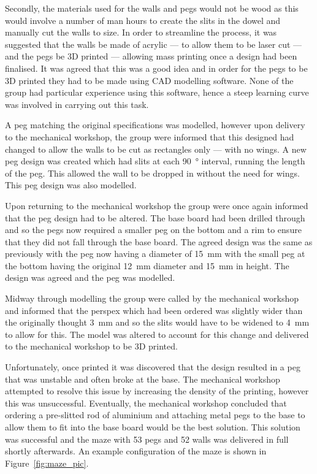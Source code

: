 Secondly, the materials used for the walls and pegs would not be wood as this 
would involve a number of man hours to create the slits in the dowel and 
manually cut the walls to size. In order to streamline the process, it was 
suggested that the walls be made of acrylic --- to allow 
them to be laser cut --- and the pegs be 3D printed --- allowing mass printing 
once a design had been finalised. It was agreed that this was a good idea and 
in order for the pegs to be 3D printed they had to be made using CAD modelling 
software. None of the group had particular experience using this software, hence 
a steep learning curve was involved in carrying out this task. 

A peg matching the original specifications was modelled, however upon delivery 
to the mechanical workshop, the group were informed that this designed had 
changed to allow the walls to be cut as rectangles only --- with no wings. A new 
peg design was created which had slits at each \SI{90}{\degree} interval, 
running the length of the peg. This allowed the wall to be dropped in without 
the need for wings. This peg design was also modelled. 

Upon returning to the mechanical workshop the group were once again informed 
that the peg design had to be altered. The base board had been drilled through 
and so the pegs now required a smaller peg on the bottom and a rim to ensure 
that they did not fall through the base board. The agreed design was the same as 
previously with the peg now having a diameter of \SI{15}{\mm} with the small peg 
at the bottom having the original \SI{12}{\mm} diameter and \SI{15}{\mm} in 
height. The design was agreed and the peg was modelled. 

Midway through modelling the group were called by the mechanical workshop and 
informed that the perspex which had been ordered was slightly wider than the 
originally thought \SI{3}{\mm} and so the slits would have to be widened to 
\SI{4}{\mm} to allow for this. The model was altered to account for this change and delivered to the mechanical workshop to be 3D printed. 

Unfortunately, once printed it was discovered that the design resulted in a peg 
that was unstable and often broke at the base. The mechanical workshop 
attempted to resolve this issue by increasing the density of the printing, 
however this was unsuccessful. Eventually, the mechanical workshop concluded 
that ordering a pre-slitted rod of aluminium and attaching metal pegs to the 
base to allow them to fit into the base board would be the best solution. This 
solution was successful and the maze with 53 pegs and 52 walls was
delivered in full shortly afterwards. An example configuration of the maze is shown in Figure~\ref{fig:maze_pic}.

